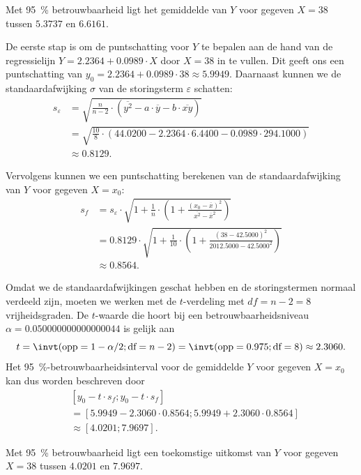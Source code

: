 \documentclass{article}
\begin{document}
        Met \SI{95}{\percent} betrouwbaarheid ligt het gemiddelde van $Y$ voor gegeven $X = 38$ tussen $5.3737$ en $6.6161$.       
    

        De eerste stap is om de puntschatting voor $Y$ te bepalen aan de hand van de regressielijn $Y = 2.2364+0.0989 \cdot X$ door $X = 38$ in te vullen.
        Dit geeft ons een puntschatting van $y_0 = 2.2364 +0.0989 \cdot 38 \approx 5.9949$.
        Daarnaast kunnen we de standaardafwijking $\sigma$ van de storingsterm $\varepsilon$ schatten:
        \begin{align*}
            s_{\varepsilon} &= \sqrt{ \frac{n}{n-2} \cdot \left( \overline{y^2} - a \cdot \overline{y} - b \cdot \overline{xy} \right) } \\ 
                               &= \sqrt{ \frac{10}{8} \cdot \left( 44.0200 - 2.2364 \cdot 6.4400 - 0.0989 \cdot 294.1000 \right) } \\ 
                               &\approx 0.8129. 
        \end{align*}

        Vervolgens kunnen we een puntschatting berekenen van de standaardafwijking van $Y$ voor gegeven $X = x_0$:
        \begin{align*}
            s_{f} &= s_{\varepsilon} \cdot \sqrt{ 1 + \frac{1}{n} \cdot \left( 1 + \frac{(x_0 - \overline{x})^2}{\overline{x^2} - \overline{x}^2} \right) } \\
                    &= 0.8129 \cdot \sqrt{ 1 + \frac{1}{10} \cdot \left( 1 + \frac{(38 - 42.5000)^2}{2012.5000 - 42.5000^2} \right) } \\
                    &\approx 0.8564.         
        \end{align*}

        Omdat we de standaardafwijkingen geschat hebben en de storingstermen normaal verdeeld zijn, moeten we werken met de $t$-verdeling met $df = n - 2 = 8$ vrijheidsgraden.
        De $t$-waarde die hoort bij een betrouwbaarheidsniveau $\alpha = 0.050000000000000044$ is gelijk aan
        \[
            t = \invt(\text{opp} = 1 - \alpha / 2; \text{df} = n - 2) = \invt(\text{opp} = 0.975; \text{df} = 8) \approx 2.3060.
        \]
        Het \SI{95}{\percent}-betrouwbaarheidsinterval voor de gemiddelde $Y$ voor gegeven $X = x_0$ kan dus worden beschreven door
        \begin{align*}
            &[y_0 - t \cdot s_{f}; y_0 - t \cdot s_{f}] \\ 
            &= [5.9949 - 2.3060 \cdot 0.8564; 5.9949 + 2.3060 \cdot 0.8564] \\ 
            &\approx [4.0201; 7.9697]. 
        \end{align*}
        
        Met \SI{95}{\percent} betrouwbaarheid ligt een toekomstige uitkomst van $Y$ voor gegeven $X = 38$ tussen $4.0201$ en $7.9697$.
\end{document}
